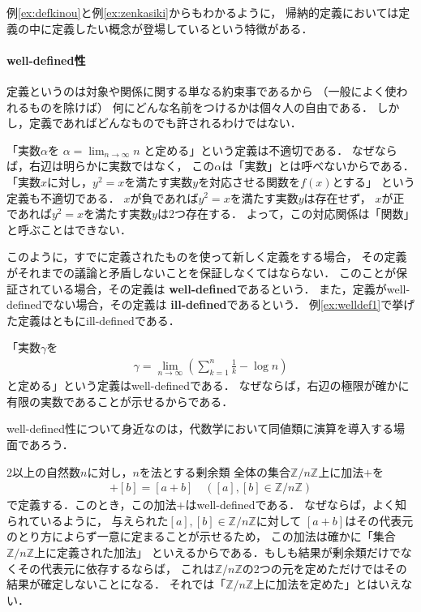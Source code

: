   例\ref{ex:defkinou}と例\ref{ex:zenkasiki}からもわかるように，
  帰納的定義においては定義の中に定義したい概念が登場しているという特徴がある．

 \paragraph{well-defined性}
  定義というのは対象や関係に関する単なる約束事であるから
  （一般によく使われるものを除けば）
  何にどんな名前をつけるかは個々人の自由である．
  しかし，定義であればどんなものでも許されるわけではない．
  \begin{ex} \label{ex:welldef1}
    「実数$\alpha$を
    $\displaystyle \alpha = \lim_{n \to \infty} n$
    と定める」という定義は不適切である．
    なぜならば，右辺は明らかに実数ではなく，
    この$\alpha$は「実数」とは呼べないからである．
    「実数$x$に対し，$y^2= x$を満たす実数$y$を対応させる関数を$f(x)$とする」
    という定義も不適切である．
    $x$が負であれば$y^2=x$を満たす実数$y$は存在せず，
    $x$が正であれば$y^2=x$を満たす実数$y$は2つ存在する．
    よって，この対応関係は「関数」と呼ぶことはできない．
  \end{ex}

  このように，すでに定義されたものを使って新しく定義をする場合，
  その定義がそれまでの議論と矛盾しないことを保証しなくてはならない．
  このことが保証されている場合，その定義は
  \textbf{well-defined}であるという．
  また，定義がwell-definedでない場合，その定義は
  \textbf{ill-defined}であるという．
  例\ref{ex:welldef1}で挙げた定義はともにill-definedである．

  \begin{ex}
    「実数$\gamma$を
    \begin{align*}
      \gamma = \lim_{n \to \infty} \left( \sum_{k=1}^{n} \frac{1}{k} - \log n \right)  
    \end{align*}
    と定める」という定義はwell-definedである．
    なぜならば，右辺の極限が確かに有限の実数であることが示せるからである．
  \end{ex}
  well-defined性について身近なのは，代数学において同値類に演算を導入する場面であろう．
  \begin{ex}
    2以上の自然数$n$に対し，$n$を法とする剰余類
    全体の集合$\mathbb{Z} / n \mathbb{Z}$上に加法$+$を
    \begin{align*}
      [a] + [b] = [ a+b ] \quad \left( [a] , [b] \in \mathbb{Z} / n \mathbb{Z} \right)
    \end{align*}
    で定義する．このとき，この加法$+$はwell-definedである．
    なぜならば，よく知られているように，
    与えられた$[a] , [b] \in \mathbb{Z} / n \mathbb{Z}$に対して
    $[a+ b]$はその代表元のとり方によらず一意に定まることが示せるため，
    この加法は確かに「集合$\mathbb{Z}/n \mathbb{Z}$上に定義された加法」
    といえるからである．もしも結果が剰余類だけでなくその代表元に依存するならば，
    これは$\mathbb{Z} / n \mathbb{Z}$の2つの元を定めただけではその結果が確定しないことになる．
    それでは「$\mathbb{Z}/ n \mathbb{Z}$上に加法を定めた」とはいえない．
  \end{ex}

